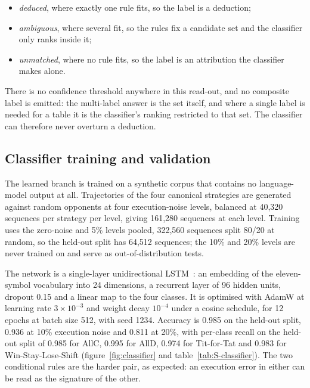 \documentclass[openacc]{rsproca_new}
\begin{document}
\begin{itemize}
\item \emph{deduced}, where exactly one rule fits, so the label is a deduction;
\item \emph{ambiguous}, where several fit, so the rules fix a candidate set and
      the classifier only ranks inside it;
\item \emph{unmatched}, where no rule fits, so the label is an attribution the
      classifier makes alone.
\end{itemize}

There is no confidence threshold anywhere in this read-out, and no composite
label is emitted: the multi-label answer is the set itself, and where a single
label is needed for a table it is the classifier's ranking restricted to that
set. The classifier can therefore never overturn a deduction.

\subsection{Classifier training and validation}\label{appendix:classifier}

The learned branch is trained on a synthetic corpus that contains no
language-model output at all. Trajectories of the four canonical strategies are
generated against random opponents at four execution-noise levels, balanced at
40{,}320 sequences per strategy per level, giving 161{,}280 sequences at each
level. Training uses the zero-noise and 5\% levels pooled, 322{,}560 sequences
split 80/20 at random, so the held-out split has 64{,}512 sequences; the 10\%
and 20\% levels are never trained on and serve as out-of-distribution tests.

The network is a single-layer unidirectional LSTM~\cite{lstm}: an
embedding of the eleven-symbol vocabulary into 24 dimensions, a recurrent
layer of 96 hidden units, dropout 0.15 and a linear map to the four classes.
It is optimised with AdamW at learning rate $3\times10^{-3}$ and weight decay
$10^{-4}$ under a cosine schedule, for 12 epochs at batch size 512, with seed
1234. Accuracy is 0.985 on the held-out split, 0.936 at 10\% execution noise
and 0.811 at 20\%, with per-class recall on the held-out split of 0.985 for
AllC, 0.995 for AllD, 0.974 for Tit-for-Tat and 0.983 for Win-Stay-Lose-Shift
(figure~\ref{fig:classifier} and table~\ref{tab:S-classifier}). The two
conditional rules are the harder pair,
as expected: an execution error in either can be read as the signature of the
other.
\end{document}
